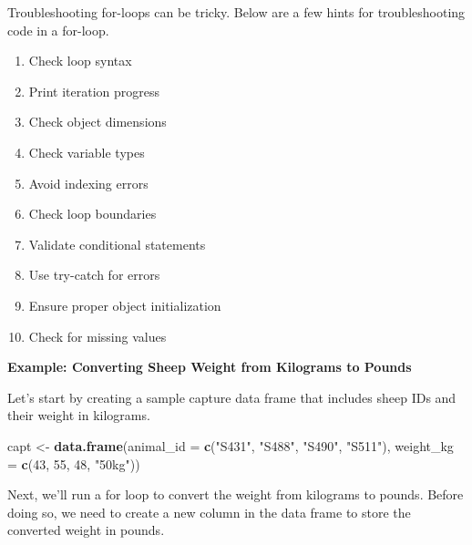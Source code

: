 \documentclass[
]{book}
\newenvironment{Shaded}{\begin{snugshade}}{\end{snugshade}}
\newcommand{\AttributeTok}[1]{\textcolor[rgb]{0.13,0.29,0.53}{#1}}
\newcommand{\CommentTok}[1]{\textcolor[rgb]{0.56,0.35,0.01}{\textit{#1}}}
\newcommand{\ConstantTok}[1]{\textcolor[rgb]{0.56,0.35,0.01}{#1}}
\newcommand{\DecValTok}[1]{\textcolor[rgb]{0.00,0.00,0.81}{#1}}
\newcommand{\FunctionTok}[1]{\textcolor[rgb]{0.13,0.29,0.53}{\textbf{#1}}}
\newcommand{\NormalTok}[1]{#1}
\newcommand{\OtherTok}[1]{\textcolor[rgb]{0.56,0.35,0.01}{#1}}
\newcommand{\SpecialCharTok}[1]{\textcolor[rgb]{0.81,0.36,0.00}{\textbf{#1}}}
\newcommand{\StringTok}[1]{\textcolor[rgb]{0.31,0.60,0.02}{#1}}
\providecommand{\tightlist}{%
  \setlength{\itemsep}{0pt}\setlength{\parskip}{0pt}}
\begin{document}
Troubleshooting for-loops can be tricky. Below are a few hints for troubleshooting code in a for-loop.

\begin{enumerate}
\def\labelenumi{\arabic{enumi}.}
\tightlist
\item
  Check loop syntax
\item
  Print iteration progress
\item
  Check object dimensions
\item
  Check variable types
\item
  Avoid indexing errors
\item
  Check loop boundaries
\item
  Validate conditional statements
\item
  Use try-catch for errors
\item
  Ensure proper object initialization
\item
  Check for missing values
\end{enumerate}

\textbf{Example: Converting Sheep Weight from Kilograms to Pounds}

Let's start by creating a sample capture data frame that includes sheep IDs and their weight in kilograms.

\begin{Shaded}
\begin{Highlighting}[]
\NormalTok{capt }\OtherTok{\textless{}{-}} \FunctionTok{data.frame}\NormalTok{(}\AttributeTok{animal\_id =} \FunctionTok{c}\NormalTok{(}\StringTok{"S431"}\NormalTok{, }\StringTok{"S488"}\NormalTok{, }\StringTok{"S490"}\NormalTok{, }\StringTok{"S511"}\NormalTok{),}
                   \AttributeTok{weight\_kg =} \FunctionTok{c}\NormalTok{(}\DecValTok{43}\NormalTok{, }\DecValTok{55}\NormalTok{, }\DecValTok{48}\NormalTok{, }\StringTok{"50kg"}\NormalTok{))}
\end{Highlighting}
\end{Shaded}

Next, we'll run a for loop to convert the weight from kilograms to pounds. Before doing so, we need to create a new column in the data frame to store the converted weight in pounds.

\begin{Shaded}
\end{Shaded}
\end{document}
